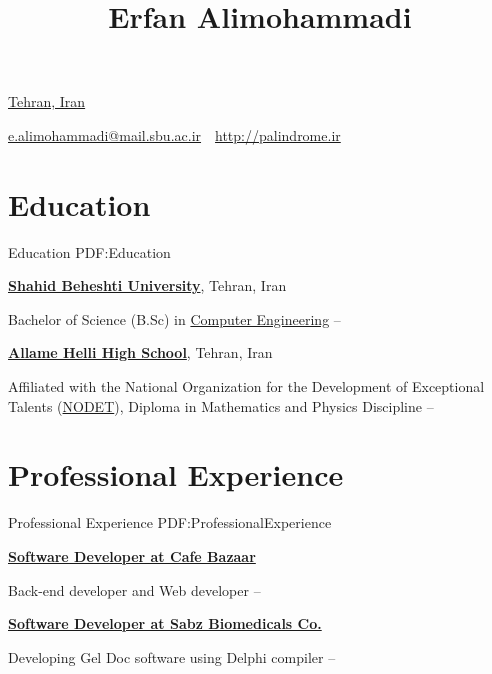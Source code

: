 \documentclass[a4paper,10pt,oneside]{article}
\begin{document}

\title{Erfan Alimohammadi}

\begin{subtitle}
\href{}
{Tehran, Iran}
\par
\href{mailto:e.alimohammadi@mail.sbu.ac.ir}
{e.alimohammadi@mail.sbu.ac.ir}
\,\BulletSymbol\,
\href{http://palindrome.ir}
{http://palindrome.ir}
\end{subtitle}

\begin{body}


\section
{Education}
{Education}
{PDF:Education}
    
\href{http://sbu.ac.ir}
{\textbf{Shahid Beheshti University}},
Tehran, Iran

\SmallEntryGap
Bachelor of Science (B.Sc) in
\href{http://sbu.ac.ir}
{Computer Engineering}
\hfill
{} --

\EntryGap
\href{http://helli.ir}
{\textbf{Allame Helli High School}},
Tehran, Iran
\par
Affiliated with the National Organization for the Development of Exceptional Talents (\href{http://www.nodet.net/}{NODET}), Diploma in Mathematics and Physics Discipline
\hfill
{} --


\section
{Professional Experience}
{Professional Experience}
{PDF:ProfessionalExperience}

\href{http://cafebazaar.ir}
{\textbf{Software Developer at Cafe Bazaar}}
\par
Back-end developer and Web developer
\hfill
{} --

\EntryGap
\href{http://sabzbiomedicals.com}
{\textbf{Software Developer at Sabz Biomedicals Co.}}
\par
Developing Gel Doc software using Delphi compiler
\hfill
{} --



\end{body}
\end{document}
